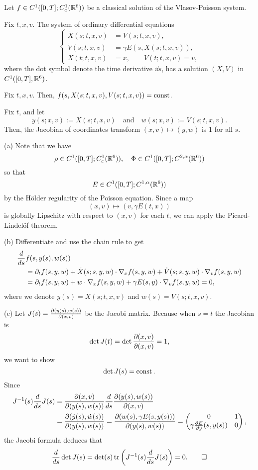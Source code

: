 \documentclass{article}
\begin{document}
\begin{lem}
Let $f\in C^1([0,T];C_c^1(\mathbb{R}^6))$ be a classical solution of the Vlasov-Poisson system.
\begin{parts}
\item Fix $t,x,v$. The system of ordinary differential equations
\[\left\{\begin{aligned}
\dot X(s;t,x,v)&=V(s;t,x,v),\\
\dot V(s;t,x,v)&=\gamma E(s,X(s;t,x,v)),\\
X(t;t,x,v)&=x,\qquad V(t;t,x,v)=v,
\end{aligned}\right.\]
where the dot symbol denote the time derivative $\dd{s}$, has a solution $(X,V)$ in $C^1([0,T],\mathbb{R}^6)$.
\item Fix $t,x,v$. Then, $f(s,X(s;t,x,v),V(s;t,x,v))=\operatorname{const}$.
\item Fix $t$, and let
\[y(s;x,v):=X(s;t,x,v)\quad\text{and}\quad w(s;x,v):=V(s;t,x,v).\]
Then, the Jacobian of coordinates transform $(x,v)\mapsto(y,w)$ is 1 for all $s$.
\end{parts}
\end{lem}
\begin{pf}
(a)
Note that we have
\[\rho\in C^1([0,T];C_c^1(\mathbb{R}^6)),\quad\Phi\in C^1([0,T];C^{2,\alpha}(\mathbb{R}^6))\]
so that
\[E\in C^1([0,T];C^{1,\alpha}(\mathbb{R}^6))\]
by the H\"older regularity of the Poisson equation.
Since a map
\[(x,v)\mapsto(v,\gamma E(t,x))\]
is globally Lipschitz with respect to $(x,v)$ for each $t$, we can apply the Picard-Lindel\"of theorem.

(b)
Differentiate and use the chain rule to get
\begin{align*}
\dd{s}&f(s,y(s),w(s))\\
&=\pd_tf(s,y,w)+\dot X(s;s,y,w)\cdot\nabla_xf(s,y,w)+\dot V(s;s,y,w)\cdot\nabla_vf(s,y,w)\\
&=\pd_tf(s,y,w)+w\cdot\nabla_xf(s,y,w)+\gamma E(s,y)\cdot\nabla_vf(s,y,w)=0,
\end{align*}
where we denote $y(s)=X(s;t,x,v)$ and $w(s)=V(s;t,x,v)$.

(c)
Let $J(s)=\pd{(y(s),w(s))}{(x,v)}$ be the Jacobi matrix.
Because when $s=t$ the Jacobian is
\[\det J(t)=\det\pd{(x,v)}{(x,v)}=1,\]
we want to show
\[\det J(s)=\operatorname{const}.\]
Since
\begin{align*}
J^{-1}(s)\dd{s}J(s)
&=\pd{(x,v)}{(y(s),w(s))}\dd{s}\pd{(y(s),w(s))}{(x,v)}\\
&=\pd{(\dot y(s),\dot w(s))}{(y(s),w(s))}
=\pd{(w(s),\gamma E(s,y(s)))}{(y(s),w(s))}
=\mat{0&1\\\gamma\pd{E}{y}(s,y(s))&0},
\end{align*}
the Jacobi formula deduces that
\[\dd{s}\det J(s)=\det(s)\tr\left(J^{-1}(s)\dd{s}J(s)\right)=0.\qedhere\]
\end{pf}
\end{document}

